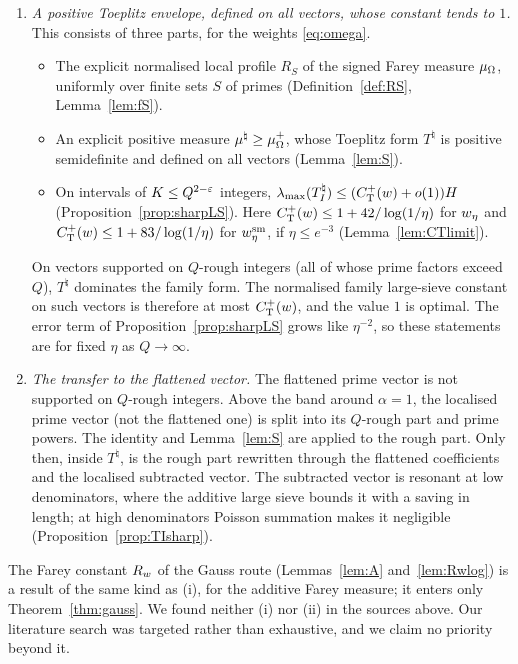 \documentclass[11pt]{amsart}
\theoremstyle{definition}
\theoremstyle{remark}
\numberwithin{equation}{section}
\begin{document}
\begin{enumerate}[label=(\roman*),leftmargin=*]
\item \emph{A positive Toeplitz envelope, defined on all vectors, whose constant tends to $1$.} This consists of three parts, for the weights \eqref{eq:omega}.
\begin{itemize}
\item The explicit normalised local profile $R_S$ of the signed Farey measure $\mu_{\Omega}$, uniformly over finite sets $S$ of primes (Definition~\ref{def:RS}, Lemma~\ref{lem:fS}).
\item An explicit positive measure $\mu^\natural\ge\mu_{\Omega}^+$, whose Toeplitz form $T^\natural$ is positive semidefinite and defined on all vectors (Lemma~\ref{lem:S}).
\item On intervals of $K\le Q^{2-\varepsilon}$ integers, $\lambda_{\max}(T^\natural_I)\le(C^{+}_{\mathrm T}(w)+o(1))H$ (Proposition~\ref{prop:sharpLS}). Here $C^{+}_{\mathrm T}(w)\le1+42/\log(1/\eta)$ for $w_\eta$ and $C^{+}_{\mathrm T}(w)\le1+83/\log(1/\eta)$ for $w^{\mathrm{sm}}_\eta$, if $\eta\le e^{-3}$ (Lemma~\ref{lem:CTlimit}).
\end{itemize}
On vectors supported on $Q$-rough integers (all of whose prime factors exceed $Q$), $T^\natural$ dominates the family form. The normalised family large-sieve constant on such vectors is therefore at most $C^{+}_{\mathrm T}(w)$, and the value $1$ is optimal. The error term of Proposition~\ref{prop:sharpLS} grows like $\eta^{-2}$, so these statements are for fixed $\eta$ as $Q\to\infty$.
\item \emph{The transfer to the flattened vector.} The flattened prime vector is not supported on $Q$-rough integers. Above the band around $\alpha=1$, the localised prime vector (not the flattened one) is split into its $Q$-rough part and prime powers. The identity and Lemma~\ref{lem:S} are applied to the rough part. Only then, inside $T^\natural$, is the rough part rewritten through the flattened coefficients and the localised subtracted vector. The subtracted vector is resonant at low denominators, where the additive large sieve bounds it with a saving in length; at high denominators Poisson summation makes it negligible (Proposition~\ref{prop:TIsharp}).
\end{enumerate}
The Farey constant $R_w$ of the Gauss route (Lemmas~\ref{lem:A} and~\ref{lem:Rwlog}) is a result of the same kind as (i), for the additive Farey measure; it enters only Theorem~\ref{thm:gauss}. We found neither (i) nor (ii) in the sources above. Our literature search was targeted rather than exhaustive, and we claim no priority beyond it.
\end{document}
